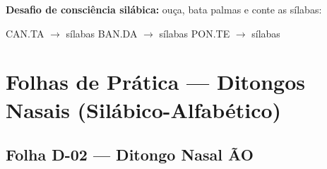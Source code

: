\begin{somsilaba}[title={\faMusic~Som das S\'ilabas --- B\^onus (n\~ao vale nota)}]
\textbf{Desafio de consci\^encia sil\'abica:} ou\c{c}a, bata palmas e conte as s\'ilabas:
\begin{center}
CAN.TA $\rightarrow$ \underline{\hspace{1cm}} s\'ilabas \quad BAN.DA $\rightarrow$ \underline{\hspace{1cm}} s\'ilabas \quad PON.TE $\rightarrow$ \underline{\hspace{1cm}} s\'ilabas
\end{center}
\end{somsilaba}



\section{Folhas de Prática --- Ditongos Nasais (Silábico-Alfabético)}


\subsection{Folha D-02 --- Ditongo Nasal \~AO}

